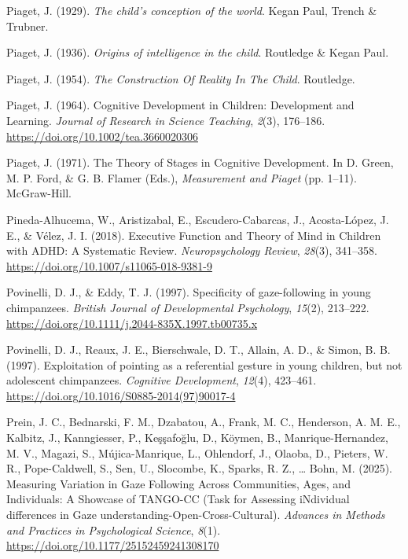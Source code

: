 \documentclass[
]{scrbook}
\newlength{\cslhangindent}
\newenvironment{CSLReferences}[2] %
 {\begin{list}{}{%
  \setlength{\itemindent}{0pt}
  \setlength{\leftmargin}{0pt}
  \setlength{\parsep}{0pt}
  \ifodd #1
   \setlength{\leftmargin}{\cslhangindent}
   \setlength{\itemindent}{-1\cslhangindent}
  \fi
  \setlength{\itemsep}{#2\baselineskip}}}
 {\end{list}}
\begin{document}
\begin{CSLReferences}{1}{0}
Piaget, J. (1929). \emph{The child's conception of the world}. Kegan Paul, Trench \& Trubner.

Piaget, J. (1936). \emph{Origins of intelligence in the child}. Routledge \& Kegan Paul.

Piaget, J. (1954). \emph{The {Construction Of Reality In The Child}}. Routledge.

Piaget, J. (1964). Cognitive {Development} in {Children}: {Development} and {Learning}. \emph{Journal of Research in Science Teaching}, \emph{2}(3), 176--186. \url{https://doi.org/10.1002/tea.3660020306}

Piaget, J. (1971). The {Theory} of {Stages} in {Cognitive Development}. In D. Green, M. P. Ford, \& G. B. Flamer (Eds.), \emph{Measurement and {Piaget}} (pp. 1--11). McGraw-Hill.

Pineda-Alhucema, W., Aristizabal, E., Escudero-Cabarcas, J., Acosta-López, J. E., \& Vélez, J. I. (2018). Executive {Function} and {Theory} of {Mind} in {Children} with {ADHD}: A {Systematic Review}. \emph{Neuropsychology Review}, \emph{28}(3), 341--358. \url{https://doi.org/10.1007/s11065-018-9381-9}

Povinelli, D. J., \& Eddy, T. J. (1997). Specificity of gaze-following in young chimpanzees. \emph{British Journal of Developmental Psychology}, \emph{15}(2), 213--222. \url{https://doi.org/10.1111/j.2044-835X.1997.tb00735.x}

Povinelli, D. J., Reaux, J. E., Bierschwale, D. T., Allain, A. D., \& Simon, B. B. (1997). Exploitation of pointing as a referential gesture in young children, but not adolescent chimpanzees. \emph{Cognitive Development}, \emph{12}(4), 423--461. \url{https://doi.org/10.1016/S0885-2014(97)90017-4}

Prein, J. C., Bednarski, F. M., Dzabatou, A., Frank, M. C., Henderson, A. M. E., Kalbitz, J., Kanngiesser, P., Keşşafoğlu, D., Köymen, B., Manrique-Hernandez, M. V., Magazi, S., Mújica-Manrique, L., Ohlendorf, J., Olaoba, D., Pieters, W. R., Pope-Caldwell, S., Sen, U., Slocombe, K., Sparks, R. Z., \ldots{} Bohn, M. (2025). Measuring {Variation} in {Gaze Following Across Communities}, {Ages}, and {Individuals}: {A Showcase} of {TANGO-CC} ({Task} for {Assessing iNdividual} differences in {Gaze} understanding-{Open-Cross-Cultural}). \emph{Advances in Methods and Practices in Psychological Science}, \emph{8}(1). \url{https://doi.org/10.1177/25152459241308170}


\end{CSLReferences}
\end{document}
